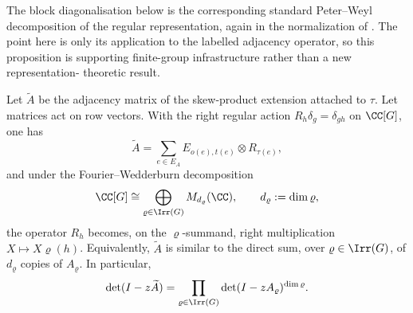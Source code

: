 The block diagonalisation below is the corresponding standard Peter--Weyl
decomposition of the regular representation, again in the normalization of
\cite{Serre1977LinearRepresentations}.  The point here is only its
application to the labelled adjacency operator, so this proposition is
supporting finite-group infrastructure rather than a new representation-
theoretic result.

\begin{proposition}
  \label{prop:kernel-peter-weyl-block-diagonalisation}
  Let \(\widetilde A\) be the adjacency matrix of the skew-product
  extension attached to \(\tau\). Let matrices act on row vectors. With
  the right regular action \(R_h\delta_g=\delta_{gh}\) on \(\CC[G]\), one
  has
  \[
    \widetilde A
    =
    \sum_{e\in E_A} E_{o(e),t(e)}\otimes R_{\tau(e)},
  \]
  and under the Fourier--Wedderburn decomposition
  \[
    \CC[G]\cong \bigoplus_{\varrho\in\Irr(G)}M_{d_\varrho}(\CC),
    \qquad d_\varrho:=\dim\varrho,
  \]
  the operator \(R_h\) becomes, on the \(\varrho\)-summand, right
  multiplication \(X\mapsto X\varrho(h)\). Equivalently, \(\widetilde A\)
  is similar to the direct sum, over \(\varrho\in\Irr(G)\), of
  \(d_\varrho\) copies of \(A_\varrho\). In particular,
  \[
    \det(I-z\widetilde A)
    =
    \prod_{\varrho\in\Irr(G)}
      \det(I-zA_\varrho)^{\dim\varrho}.
  \]
\end{proposition}

